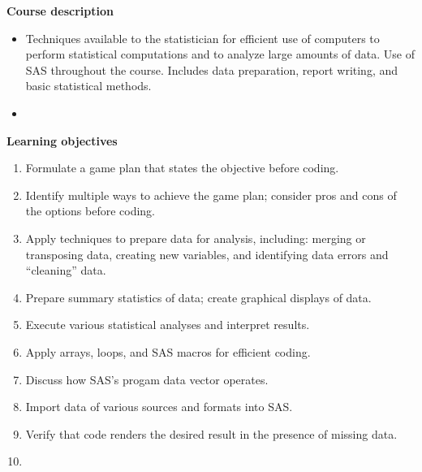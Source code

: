\documentclass[letterpaper,12pt]{report}
\begin{document}
\textbf{Course description}
\begin{itemize}
\item[]
Techniques available to the statistician for efficient use of computers to perform statistical computations and to analyze large amounts of data. Use of SAS throughout the course. Includes data preparation, report writing, and basic statistical methods.
\item[]
\end{itemize}


\textbf{Learning objectives}
\begin{enumerate}
\item Formulate a game plan that states the objective before coding.
\item Identify multiple ways to achieve the game plan; consider pros and cons of the options before coding.
\item Apply techniques to prepare data for analysis, including: merging or transposing data, creating new variables, and identifying data errors and ``cleaning'' data.
\item Prepare summary statistics of data; create graphical displays of data.
\item Execute various statistical analyses and interpret results.
\item Apply arrays, loops, and SAS macros for efficient coding.
\item Discuss how SAS's progam data vector operates.
\item Import data of various sources and formats into SAS.
\item Verify that code renders the desired result in the presence of missing data.
\item[]
\end{enumerate}
\end{document}
